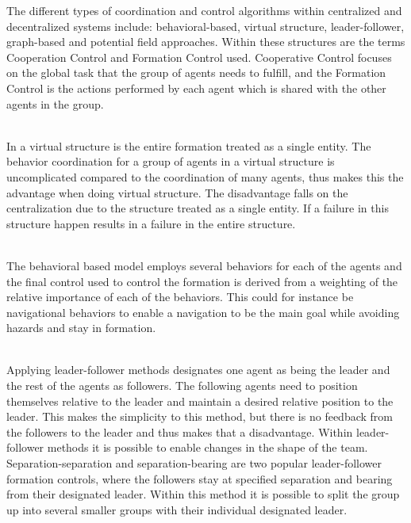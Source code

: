 The different types of coordination and control algorithms within centralized and decentralized systems include: behavioral-based, virtual structure, leader-follower, graph-based and potential field approaches. Within these structures are the terms Cooperation Control and Formation Control used. Cooperative Control focuses on the global task that the group of agents needs to fulfill, and the Formation Control is the actions performed by each agent which is shared with the other agents in the group. 
\begin{description}[style=nextline]
	\item [Virtual structure]\\
	In a virtual structure is the entire formation treated as a single entity. The behavior coordination for a group of agents in a virtual structure is uncomplicated compared to the coordination of many agents, thus makes this the advantage when doing virtual structure. The disadvantage falls on the centralization due to the structure treated as a single entity. If a failure in this structure happen results in a failure in the entire structure.
	\item [Behavior Based Methods]\\
	The behavioral based model employs several behaviors for each of the agents and the final control used to control the formation is derived from a weighting of the relative importance of each of the behaviors. This could for instance be navigational behaviors to enable a navigation to be the main goal while avoiding hazards and stay in formation.
	\item [Leader-Follower Approaches]\\
	Applying leader-follower methods designates one agent as being the leader and the rest of the agents as followers. The following agents need to position themselves relative to the leader and maintain a desired relative position to the leader. This makes the simplicity to this method, but there is no feedback from the followers to the leader and thus makes that a disadvantage. Within leader-follower methods it is possible to enable changes in the shape of the team. Separation-separation and separation-bearing are two popular leader-follower formation controls, where the followers stay at specified separation and bearing from their designated leader. Within this method it is possible to split the group up into several smaller groups with their individual designated leader.
	\item [Potential Field Approach]\\

\end{description}
